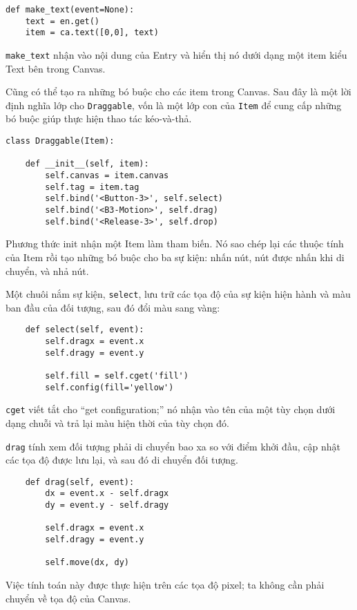 \documentclass[11pt]{book}
\begin{document}
\beforeverb
\begin{verbatim}
def make_text(event=None):
    text = en.get()
    item = ca.text([0,0], text)
\end{verbatim}
\afterverb
%
\verb"make_text" nhận vào nội dung của Entry và hiển thị
nó dưới dạng một item kiểu Text bên trong Canvas.

Cũng có thể tạo ra những bó buộc cho các item trong Canvas.
Sau đây là một lời định nghĩa lớp cho {\tt Draggable},
vốn là một lớp con của {\tt Item} để cung cấp những bó buộc
giúp thực hiện thao tác kéo-và-thả.


\beforeverb
\begin{verbatim}
class Draggable(Item):

    def __init__(self, item):
        self.canvas = item.canvas
        self.tag = item.tag
        self.bind('<Button-3>', self.select)
        self.bind('<B3-Motion>', self.drag)
        self.bind('<Release-3>', self.drop)
\end{verbatim}
\afterverb
%
Phương thức init nhận một Item làm tham biến. Nó sao chép lại
các thuộc tính của Item rồi tạo những bó buộc cho ba sự kiện:
nhấn nút, nút được nhấn khi di chuyển, và nhả nút.

Một chuôi nắm sự kiện, {\tt select}, lưu trữ các tọa độ của
sự kiện hiện hành và màu ban đầu của đối tượng, sau đó
đổi màu sang vàng:

\beforeverb
\begin{verbatim}
    def select(self, event):
        self.dragx = event.x
        self.dragy = event.y

        self.fill = self.cget('fill')
        self.config(fill='yellow')
\end{verbatim}
\afterverb
%
{\tt cget} viết tắt cho ``get configuration;'' nó nhận vào tên của
một tùy chọn dưới dạng chuỗi và trả lại màu hiện thời của tùy chọn đó.

{\tt drag} tính xem đối tượng phải di chuyển bao xa so với
điểm khởi đầu, cập nhật các tọa độ được lưu lại, và sau đó di chuyển
đối tượng.


\beforeverb
\begin{verbatim}
    def drag(self, event):
        dx = event.x - self.dragx
        dy = event.y - self.dragy

        self.dragx = event.x
        self.dragy = event.y

        self.move(dx, dy)
\end{verbatim}
\afterverb
%
Việc tính toán này được thực hiện trên các tọa độ pixel; ta không cần
phải chuyển về tọa độ của Canvas.
\end{document}
